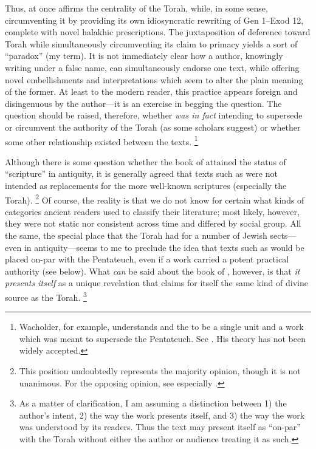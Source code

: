 
\noindent
Thus, \jub at once affirms the centrality of the Torah, while, in some sense, circumventing it by providing its own idiosyncratic rewriting of Gen 1--Exod 12, complete with novel halakhic prescriptions. The juxtaposition of deference toward Torah while simultaneously circumventing its claim to primacy yields a sort of ``\psgraphical paradox'' (my term). It is not immediately clear how a \psgraphical author, knowingly writing under a false name, can simultaneously endorse one text, while offering novel embellishments and interpretations which seem to alter the plain meaning of the former. At least to the modern reader, this practice appears foreign and disingenuous by the \psgraphical author---it is an exercise in begging the question. The question should be raised, therefore, whether \jub \emph{was in fact} intending to supersede or circumvent the authority of the Torah (as some scholars suggest) or whether some other relationship existed between the texts.%
    \footnote{Wacholder, for example, understands \jub and the \templescroll to be a single unit and a work which was meant to supersede the Pentateuch. See \cite{wacholder_kampen-etal1997}. His theory has not been widely accepted.}

Although there is some question whether the book of \jub attained the status of ``scripture'' in antiquity, it is generally agreed that \psgraphical texts such as \jub were not intended as replacements for the more well-known scriptures (especially the Torah).%
    \footnote{This position undoubtedly represents the majority opinion, though it is not unanimous. For the opposing opinion, see especially \cite{wacholder_kampen-etal1997}.}
Of course, the reality is that we do not know for certain what kinds of categories ancient readers used to classify their literature; most likely, however, they were not static nor consistent across time and differed by social group. All the same, the special place that the Torah had for a number of Jewish sects---even in antiquity---seems to me to preclude the idea that \psgraphical texts such as \jub would be placed on-par with the Pentateuch, even if a work carried a potent practical authority (see below). What \emph{can} be said about the book of \jub, however, is that \emph{it presents itself} as a unique revelation that claims for itself the same kind of divine source as the Torah.%
    \footnote{As a matter of clarification, I am assuming a distinction between 1) the author's intent, 2) the way the work presents itself, and 3) the way the work was understood by its readers. Thus the text may present itself as ``on-par'' with the Torah without either the author or audience treating it as such.}

